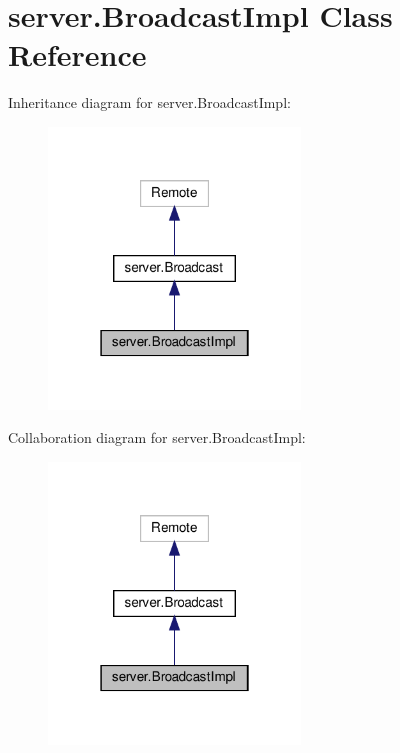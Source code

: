 \hypertarget{classserver_1_1_broadcast_impl}{}\section{server.\+Broadcast\+Impl Class Reference}
\label{classserver_1_1_broadcast_impl}


Inheritance diagram for server.\+Broadcast\+Impl\+:
\nopagebreak
\begin{figure}[H]
\begin{center}
\leavevmode
\includegraphics[width=190pt]{classserver_1_1_broadcast_impl__inherit__graph}
\end{center}
\end{figure}


Collaboration diagram for server.\+Broadcast\+Impl\+:
\nopagebreak
\begin{figure}[H]
\begin{center}
\leavevmode
\includegraphics[width=190pt]{classserver_1_1_broadcast_impl__coll__graph}
\end{center}
\end{figure}
